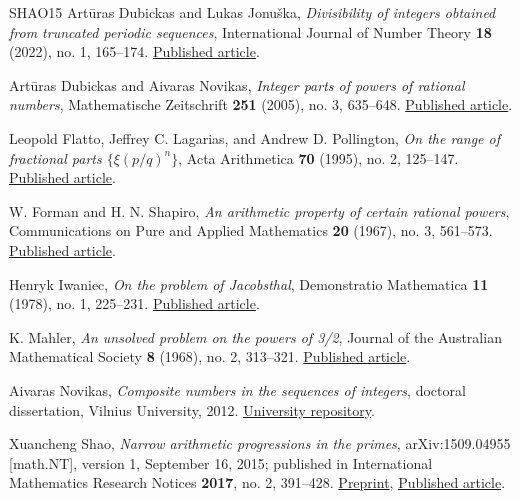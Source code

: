 \documentclass[11pt,reqno]{amsart}
\theoremstyle{definition}
\theoremstyle{definition}
\theoremstyle{remark}
\begin{document}
\begin{thebibliography}{SHAO15}
\label{ref-dj22}
Artūras Dubickas and Lukas Jonuška, \emph{Divisibility of integers
obtained from truncated periodic sequences}, International Journal of
Number Theory \textbf{18} (2022), no. 1, 165--174.
\href{https://doi.org/10.1142/S1793042122500129}{Published article}.

\label{ref-dn}
Artūras Dubickas and Aivaras Novikas, \emph{Integer parts of powers of
rational numbers}, Mathematische Zeitschrift \textbf{251} (2005), no. 3,
635--648. \href{https://doi.org/10.1007/s00209-005-0827-4}{Published article}.

\label{ref-flp}
Leopold Flatto, Jeffrey C. Lagarias, and Andrew D. Pollington,
\emph{On the range of fractional parts \(\{\xi(p/q)^n\}\)},
Acta Arithmetica \textbf{70} (1995), no. 2, 125--147.
\href{https://doi.org/10.4064/aa-70-2-125-147}{Published article}.

\label{ref-fs}
W. Forman and H. N. Shapiro, \emph{An arithmetic property of certain
rational powers}, Communications on Pure and Applied Mathematics
\textbf{20} (1967), no. 3, 561--573.
\href{https://doi.org/10.1002/cpa.3160200305}{Published article}.

\label{ref-iw78}
Henryk Iwaniec, \emph{On the problem of Jacobsthal}, Demonstratio
Mathematica \textbf{11} (1978), no. 1, 225--231.
\href{https://doi.org/10.1515/dema-1978-0121}{Published article}.

\label{ref-m68}
K. Mahler, \emph{An unsolved problem on the powers of 3/2},
Journal of the Australian Mathematical Society \textbf{8} (1968), no. 2,
313--321. \href{https://doi.org/10.1017/S1446788700005371}{Published article}.

\label{ref-n}
Aivaras Novikas, \emph{Composite numbers in the sequences of integers},
doctoral dissertation, Vilnius University, 2012.
\href{https://epublications.vu.lt/object/elaba:2089125/index.html}{University repository}.

\label{ref-shao15}
Xuancheng Shao, \emph{Narrow arithmetic progressions in the
primes}, arXiv:1509.04955 {[}math.NT{]}, version 1, September 16, 2015;
published in International Mathematics Research Notices \textbf{2017}, no. 2,
391--428. \href{https://arxiv.org/abs/1509.04955v1}{Preprint},
\href{https://doi.org/10.1093/imrn/rnv393}{Published article}.


\end{thebibliography}
\end{document}
